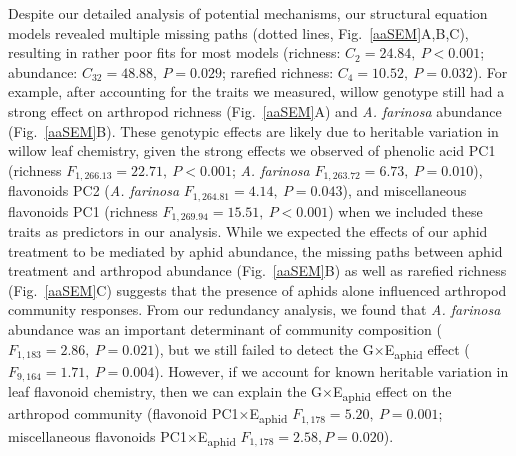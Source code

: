 \documentclass[11pt]{article}
\begin{document}
Despite our detailed analysis of potential mechanisms, our structural
equation models revealed multiple missing paths (dotted lines, Fig.~\ref{aaSEM}A,B,C), resulting in rather poor fits for most models (richness:
\(C_2=24.84,\ P<0.001\); abundance: \(C_{32}=48.88,\ P=0.029\); rarefied richness:
\(C_4=10.52,\ P=0.032\)). For example, after accounting for the traits we
measured, willow genotype still had a strong effect on arthropod
richness (Fig.~\ref{aaSEM}A) and \textit{A. farinosa} abundance (Fig.~\ref{aaSEM}B). These genotypic effects are likely due to heritable variation in willow leaf chemistry, given the strong effects we observed of phenolic acid PC1 (richness \(F_{1,266.13} = 22.71,\ P<0.001\); \textit{A. farinosa} \(F_{1,263.72} = 6.73,\ P=0.010\)), flavonoids PC2 (\textit{A. farinosa} \(F_{1,264.81} = 4.14,\ P=0.043\)), and miscellaneous flavonoids PC1 (richness \(F_{1,269.94} = 15.51,\ P<0.001\)) when we included these traits as predictors in our analysis. %
While we expected the effects of our aphid treatment to be mediated by aphid abundance, the missing paths between aphid treatment and arthropod abundance (Fig.~\ref{aaSEM}B) as well as rarefied richness (Fig.~\ref{aaSEM}C) suggests that the presence of aphids alone influenced arthropod community responses. 
From our redundancy
analysis, we found that \textit{A. farinosa}
abundance was an important determinant of community composition (\(F_{1,183}=2.86,\ P=0.021\)), %
but we still failed to detect %
the G$\times$E\textsubscript{aphid} effect
(\(F_{9,164}=1.71,\ P=0.004\)). However, if we account for known heritable variation in leaf flavonoid chemistry, then we can explain the G$\times$E\textsubscript{aphid} effect on the arthropod community (flavonoid PC1$\times$E\textsubscript{aphid} \(F_{1,178} = 5.20,\ P=0.001\); miscellaneous flavonoids PC1$\times$E\textsubscript{aphid} \(F_{1,178} = 2.58, P = 0.020\)). %
\end{document}
